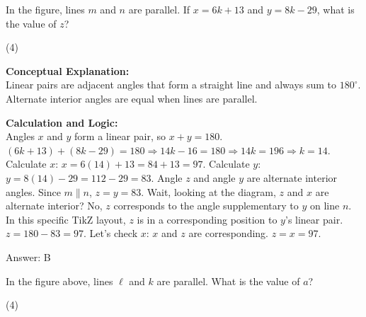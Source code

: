 \documentclass[11pt,paper=a4,answers]{exam}
\begin{document}
\begin{questions}
\question
\begin{center}
\end{center}
In the figure, lines $m$ and $n$ are parallel. If $x = 6k + 13$ and $y = 8k - 29$, what is the value of $z$?
\begin{tasks}(4)
\end{tasks}

\begin{solution}
\textbf{Conceptual Explanation:} \\
Linear pairs are adjacent angles that form a straight line and always sum to $180^\circ$. Alternate interior angles are equal when lines are parallel.

\vspace{30pt}

\textbf{Calculation and Logic:} \\
Angles $x$ and $y$ form a linear pair, so $x + y = 180$. 
$(6k + 13) + (8k - 29) = 180 \Rightarrow 14k - 16 = 180 \Rightarrow 14k = 196 \Rightarrow k = 14$.
Calculate $x$: $x = 6(14) + 13 = 84 + 13 = 97$.
Calculate $y$: $y = 8(14) - 29 = 112 - 29 = 83$.
Angle $z$ and angle $y$ are alternate interior angles. Since $m \parallel n$, $z = y = 83$. 
Wait, looking at the diagram, $z$ and $x$ are alternate interior? No, $z$ corresponds to the angle supplementary to $y$ on line $n$. In this specific TikZ layout, $z$ is in a corresponding position to $y$'s linear pair. $z = 180 - 83 = 97$. Let's check $x$: $x$ and $z$ are corresponding. $z = x = 97$.

\vspace{30pt}

Answer: \colorbox{yellow!100}{B} %
\end{solution}

\vspace{60pt}

\question
\begin{center}
\end{center}
In the figure above, lines $\ell$ and $k$ are parallel. What is the value of $a$?
\begin{tasks}(4)
\end{tasks}


\end{questions}
\end{document}
